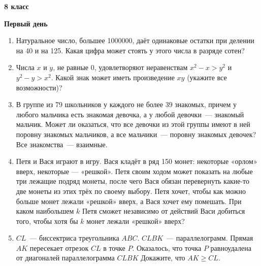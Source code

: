 \documentclass{article}
\begin{document}
\large
	
\begin{center}
	\LARGE\textbf{8 класс}
\end{center}
\begin{center}
	\large\textbf{Первый день}
\end{center}


\begin{enumerate}[label*=8.{\arabic{enumi}}]

\item Натуральное число, большее 1000000, даёт одинаковые остатки при делении на 40 и на 125. Какая цифра может стоять у этого числа в разряде сотен?
\item Числа $x$ и $y$, не равные 0, удовлетворяют неравенствам $x^2-x > y^2$ и $y^2-y > x^2$. Какой знак может иметь произведение $xy$ (укажите все возможности)?
\item В группе из 79 школьников у каждого не более 39 знакомых, причем у любого мальчика есть знакомая девочка, а у любой девочки~--- знакомый мальчик. Может ли оказаться, что все девочки из этой группы имеют в ней поровну знакомых мальчиков, а все мальчики~--- поровну знакомых девочек? Все знакомства~--- взаимные.
\item Петя и Вася играют в игру. Вася кладёт в ряд 150 монет: некоторые «орлом» вверх, некоторые — «решкой». Петя своим ходом может показать на любые три лежащие подряд монеты, после чего Вася обязан перевернуть какие-то две монеты из этих трёх по своему выбору. Петя хочет, чтобы как можно больше монет лежали «решкой» вверх, а Вася хочет ему помешать. При каком наибольшем $k$ Петя сможет независимо от действий Васи добиться того, чтобы хотя бы $k$ монет лежали «решкой» вверх?
\item $CL$~--- биссектриса треугольника $ABC$. $CLBK$~--- параллелограмм. Прямая $AK$ пересекает отрезок $CL$ в точке $P$. Оказалось, что точка $P$ равноудалена от диагоналей параллелограмма $CLBK$ Докажите, что $AK \geqslant CL$.
	

\end{enumerate}
\end{document}
